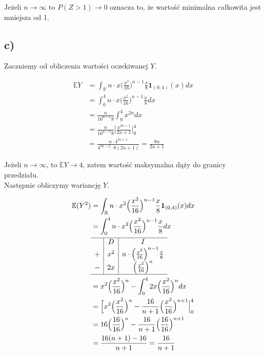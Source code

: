 \documentclass{article}
\begin{document}
{Jeżeli $n \rightarrow \infty$ to $P(Z>1) \rightarrow 0$ oznacza to, że wartość minimalna całkowita jest mniejsza od 1.

\subsection{c)}
Zaczniemy od obliczenia wartości oczekiwanej $Y$.

\begin{align*}
\mathbb{E}Y & = \int_{\mathbb{R}}^{} n\cdot x \Big( \frac{x^2}{16} \Big)^{n-1} \frac{x}{8} \textbf{1}_{(0,4)}(x) dx \\
& = \int_{0}^{4} n\cdot x \Big( \frac{x^2}{16} \Big)^{n-1} \frac{x}{8} dx \\
& = \frac{n}{16^{n-1}8} \int_{0}^{4} x^{2n} dx \\
& =  \frac{n}{16^{n-1}8} \Big[ \frac{x^{2n+1}}{2n+1} \Big\vert_0^4 \\
& = \frac{n \cdot 4^{2n+1}}{4^{2n-2} \cdot 8(2n+1)} = \frac{8n}{2n+1}
\end{align*}

Jeżeli $n \rightarrow \infty$, to $ \mathbb{E}Y \rightarrow 4$, zatem wartość maksymalna dąży do granicy przedziału.\\
Następnie obliczymy wariancję $Y$.

\begin{align*}
\mathbb{E}(Y^2) & = \int_{\mathbb{R}}^{} n\cdot x^2 \Big( \frac{x^2}{16} \Big)^{n-1} \frac{x}{8} \textbf{1}_{(0,4)}(x) dx \\
& = \int_{0}^{4} n\cdot x^2 \Big( \frac{x^2}{16} \Big)^{n-1} \frac{x}{8} dx \\
&\begin{array}{c|c|c}
\hline
& D & I \\
+ & x^2 & n\cdot \Big( \frac{x^2}{16} \Big)^{n-1} \frac{x}{8} \\
- & 2x & \Big( \frac{x^2}{16} \Big)^n \\
\hline
\end{array} \\
& = x^2 \Big( \frac{x^2}{16} \Big)^n - \int_{0}^{4} 2x \Big( \frac{x^2}{16} \Big)^n dx \\
& = \Big[ x^2 \Big( \frac{x^2}{16} \Big)^n - \frac{16}{n+1} \Big( \frac{x^2}{16} \Big)^{n+1} \Big\vert_0^4 \\
& = 16 \Big( \frac{16}{16} \Big)^n - \frac{16}{n+1} \Big( \frac{16}{16} \Big)^{n+1} \\
& = \frac{16(n+1) - 16}{n+1} = \frac{16}{n+1}
\end{align*}

}
\end{document}
